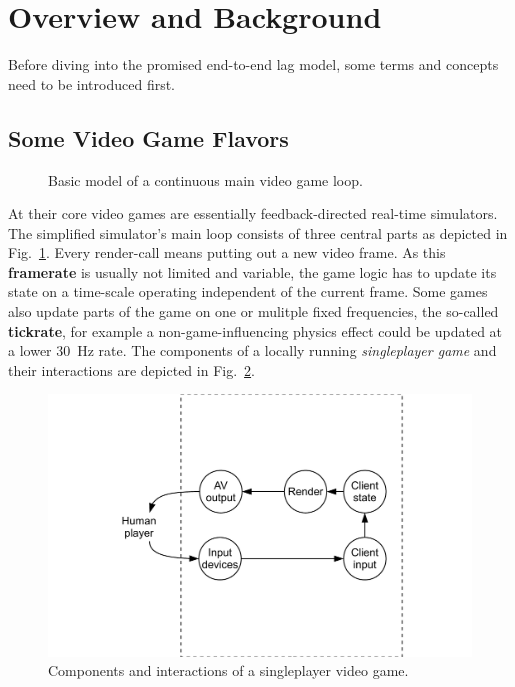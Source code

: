 \section{Overview and Background}
\label{sec:background}

Before diving into the promised end-to-end lag model, some terms and concepts need to be introduced first.


\subsection{Some Video Game Flavors}

\begin{figure}[!t]
\centering
\removelatexerror
\begin{algorithm}[H]
\end{algorithm}
\caption{Basic model of a continuous main video game loop.}
\label{alg:gameloop1}
\end{figure}

At their core video games are essentially feedback-directed real-time simulators. The simplified simulator's main loop consists of three central parts as depicted in Fig.~\ref{alg:gameloop1}. Every render-call means putting out a new video frame. As this \textbf{framerate} is usually not limited and variable, the game logic has to update its state on a time-scale operating independent of the current frame. Some games also update parts of the game on one or mulitple fixed frequencies, the so-called \textbf{tickrate}, for example a non-game-influencing physics effect could be updated at a lower \SI{30}{\hertz} rate. The components of a locally running \textit{singleplayer game} and their interactions are depicted in Fig.~\ref{fig:component-model-local}.

\begin{figure}
  \centering
  \includegraphics[width=0.8\columnwidth]{../models/component_interaction-local.pdf}
  \caption{Components and interactions of a singleplayer video game.}
  \label{fig:component-model-local}
\end{figure}

